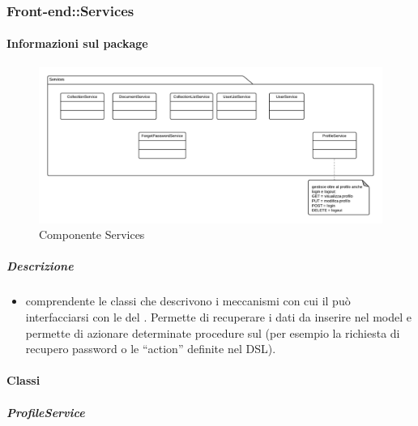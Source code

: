 	\subsubsection{Front-end::Services}
	\paragraph{Informazioni sul package} 
		\begin{figure}[H] 
			\begin{center} 
				\includegraphics[width=\textwidth]{uml/package/Front-end::Services.png}  
				\caption{Componente Services}
			\end{center}  
		\end{figure} 
	\subparagraph{Descrizione} 
		\begin{itemize}
		\item[]  comprendente le classi che descrivono i meccanismi con cui il  può interfacciarsi con le  del . Permette di recuperare i dati da inserire nel model e permette di azionare determinate procedure sul  (per esempio la richiesta di recupero password o le ``action'' definite nel DSL).
		\end{itemize} 
		\paragraph{Classi}
			\subparagraph{ProfileService}
				
